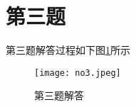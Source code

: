 \documentclass[a4paper]{article}
\begin{document}
\section{第三题}
第三题解答过程如下图\ref{image}所示
\begin{figure}[htbp]
	\centering
	\texttt{[image: no3.jpeg]}
	\caption{\label{image}第三题解答}
\end{figure}
%
%
%
\end{document}
